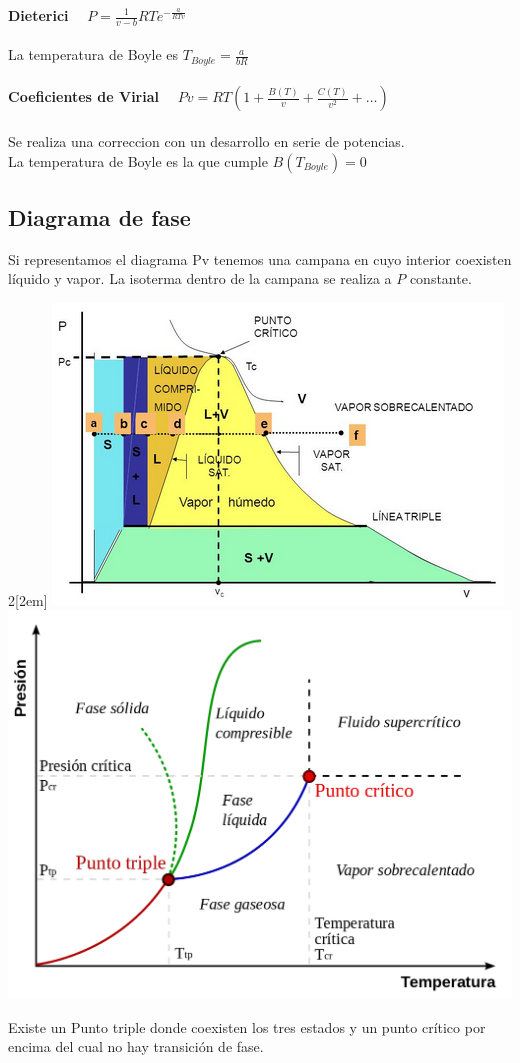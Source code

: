 \documentclass{myclass}
\begin{document}
\noindent
\textbf{Dieterici} \ \
$
\boxed{P = \frac{1}{v-b}RTe^{-\frac{a}{RTv}}}
$\\
\\
La temperatura de Boyle es $T_{Boyle} = \frac{a}{bR}$ \\
\\
\textbf{Coeficientes de Virial} \ \
$
\boxed{Pv = RT(1+ \frac{B(T)}{v} + \frac{C(T)}{v^2} + \ldots)}
$
\\ \\
Se realiza una correccion con un desarrollo en serie de potencias. \\
La temperatura de Boyle es la que cumple $B(T_{Boyle})=0$
\subsection{Diagrama de fase}
Si representamos el diagrama Pv tenemos una campana en cuyo interior coexisten líquido y vapor. La isoterma dentro de la campana se realiza a $P$ constante. 
\newline

\begin{multicols}{2}[\columnsep2em]
\includegraphics[scale=0.5]{images/Pv_fases.png}
\columnbreak
\includegraphics[scale=0.12]{images/PT-fase.png}
\end{multicols}
\noindent
Existe un Punto triple donde coexisten los tres estados y un punto crítico por encima del cual no hay transición de fase.
\end{document}
